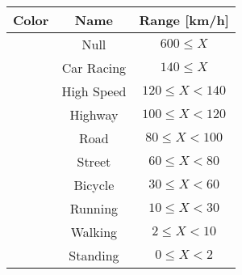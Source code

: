 \begin{longtable*}{|c|c|c|}\hline
{}
Color&Name&Range [km/h]\\\hline\hline
{} &Null&$600\leq X$\\\hline
{} &Car Racing&$140\leq X$\\\hline
{} &High Speed&$120\leq X<140$\\\hline
{} &Highway&$100\leq X<120$\\\hline
{} &Road&$80\leq X<100$\\\hline
{} &Street&$60\leq X<80$\\\hline
{} &Bicycle&$30\leq X<60$\\\hline
{} &Running&$10\leq X<30$\\\hline
{} &Walking&$2\leq X<10$\\\hline
{} &Standing&$0\leq X<2$\\\hline
\end{longtable*}
